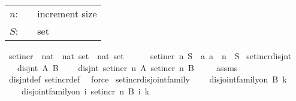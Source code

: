 \begin{isabellebody}
\begin{isamarkuptext}
\begin{tabular}{llp{8cm}}
$n$:& \isa{nat}& increment size\\
$S$:& \isa{nat\ set}& set\\
\end{tabular}%
\end{isamarkuptext}\isamarkuptrue%
\isamarkupfalse%
\ set{\isacharunderscore}{\kern0pt}incr\ {\isacharcolon}{\kern0pt}{\isacharcolon}{\kern0pt}\ {\isachardoublequoteopen}nat\ {\isasymRightarrow}\ nat\ set\ {\isasymRightarrow}\ nat\ set{\isachardoublequoteclose}\isanewline
\ \ \isanewline
\ \ \ {\isachardoublequoteopen}set{\isacharunderscore}{\kern0pt}incr\ n\ S\ {\isasymequiv}\ {\isacharparenleft}{\kern0pt}{\isasymlambda}a{\isachardot}{\kern0pt}\ a\ {\isacharplus}{\kern0pt}\ n{\isacharparenright}{\kern0pt}\ {\isacharbackquote}{\kern0pt}\ S{\isachardoublequoteclose}\isanewline
\isanewline
{}\isamarkupfalse%
\ set{\isacharunderscore}{\kern0pt}incr{\isacharunderscore}{\kern0pt}disjnt{\isacharcolon}{\kern0pt}\ \isanewline
\ \ \ {\isachardoublequoteopen}disjnt\ A\ B{\isachardoublequoteclose}\ \isanewline
\ \ \ {\isachardoublequoteopen}disjnt\ {\isacharparenleft}{\kern0pt}set{\isacharunderscore}{\kern0pt}incr\ n\ A{\isacharparenright}{\kern0pt}\ {\isacharparenleft}{\kern0pt}set{\isacharunderscore}{\kern0pt}incr\ n\ B{\isacharparenright}{\kern0pt}{\isachardoublequoteclose}\ \isanewline
%
\isadelimproof
\ \ %
\endisadelimproof
%
\isatagproof
{}\isamarkupfalse%
\ assms\ \isamarkupfalse%
\ disjnt{\isacharunderscore}{\kern0pt}def\ set{\isacharunderscore}{\kern0pt}incr{\isacharunderscore}{\kern0pt}def\ \isamarkupfalse%
\ force%
\endisatagproof
{\isafoldproof}%
%
\isadelimproof
\isanewline
%
\endisadelimproof
\isanewline
{}\isamarkupfalse%
\ set{\isacharunderscore}{\kern0pt}incr{\isacharunderscore}{\kern0pt}disjoint{\isacharunderscore}{\kern0pt}family{\isacharcolon}{\kern0pt}\ \isanewline
\ \ \ {\isachardoublequoteopen}disjoint{\isacharunderscore}{\kern0pt}family{\isacharunderscore}{\kern0pt}on\ B\ {\isacharbraceleft}{\kern0pt}{\isachardot}{\kern0pt}{\isachardot}{\kern0pt}k{\isacharbraceright}{\kern0pt}{\isachardoublequoteclose}\ \isanewline
\ \ \ {\isachardoublequoteopen}\ disjoint{\isacharunderscore}{\kern0pt}family{\isacharunderscore}{\kern0pt}on\ {\isacharparenleft}{\kern0pt}{\isasymlambda}i{\isachardot}{\kern0pt}\ set{\isacharunderscore}{\kern0pt}incr\ n\ {\isacharparenleft}{\kern0pt}B\ i{\isacharparenright}{\kern0pt}{\isacharparenright}{\kern0pt}\ {\isacharbraceleft}{\kern0pt}{\isachardot}{\kern0pt}{\isachardot}{\kern0pt}k{\isacharbraceright}{\kern0pt}{\isachardoublequoteclose}\ \isanewline

\end{isabellebody}
